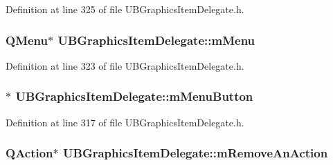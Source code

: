 Definition at line 325 of file U\-B\-Graphics\-Item\-Delegate.\-h.

\hypertarget{class_u_b_graphics_item_delegate_abdb23ab4b93f3bc0b28a2329543dd88a}{
\subsubsection[{m\-Menu}]{\setlength{\rightskip}{0pt plus 5cm}Q\-Menu$\ast$ U\-B\-Graphics\-Item\-Delegate\-::m\-Menu\hspace{0.3cm}{\ttfamily [protected]}}}\label{dd/dd5/class_u_b_graphics_item_delegate_abdb23ab4b93f3bc0b28a2329543dd88a}


Definition at line 323 of file U\-B\-Graphics\-Item\-Delegate.\-h.

\hypertarget{class_u_b_graphics_item_delegate_a6f334e39a32eedb572831748b7d07fb7}{
\subsubsection[{m\-Menu\-Button}]{$\ast$ U\-B\-Graphics\-Item\-Delegate\-::m\-Menu\-Button\hspace{0.3cm}{\ttfamily [protected]}}}\label{dd/dd5/class_u_b_graphics_item_delegate_a6f334e39a32eedb572831748b7d07fb7}


Definition at line 317 of file U\-B\-Graphics\-Item\-Delegate.\-h.

\hypertarget{class_u_b_graphics_item_delegate_aa80345f33555d22acbda9227aa5d001b}{
\subsubsection[{m\-Remove\-An\-Action}]{\setlength{\rightskip}{0pt plus 5cm}Q\-Action$\ast$ U\-B\-Graphics\-Item\-Delegate\-::m\-Remove\-An\-Action\hspace{0.3cm}{\ttfamily [protected]}}}\label{dd/dd5/class_u_b_graphics_item_delegate_aa80345f33555d22acbda9227aa5d001b}


